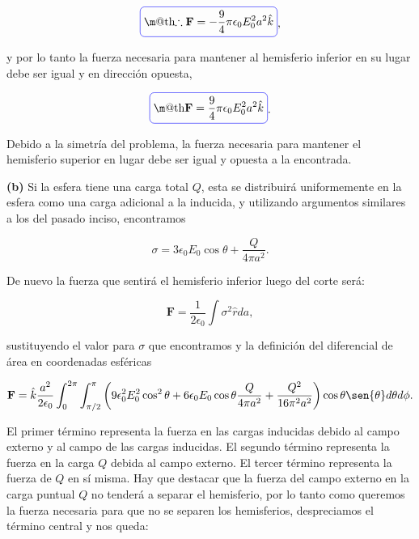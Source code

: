 \documentclass[a4paper,10pt]{article}
\makeatletter
\numberwithin{equation}{section}
\newcommand*{\boxcolor}{blue}
\renewcommand{\boxed}[1]{\textcolor{\boxcolor}{%
\tikz[baseline={([yshift=-1ex]current bounding box.center)}] \node [rectangle, minimum width=1ex,rounded corners,draw] {\normalcolor\m@th$\displaystyle#1$};}}
\makeatother
\begin{document}
\begin{equation}
 \boxed{\therefore \mathbf{F} = - \frac{9}{4}\pi\epsilon_0E_0^2a^2\hat{k}},
\end{equation}

y por lo tanto la fuerza necesaria para mantener al hemisferio inferior en su lugar 
debe ser igual y en dirección opuesta, 

\begin{equation}
 \boxed{\mathbf{F} = \frac{9}{4}\pi\epsilon_0E_0^2a^2\hat{k}}.
\end{equation}

Debido a la simetría del problema, la fuerza necesaria para mantener el hemisferio 
superior en lugar debe ser igual y opuesta a la encontrada.

\vspace{.3cm}

\textbf{(b)} Si la esfera tiene una carga total $Q$, esta se distribuirá uniformemente 
en la esfera como una carga adicional a la inducida, y utilizando argumentos similares 
a los del pasado inciso, encontramos 

\begin{equation}
 \sigma = 3\epsilon_0 E_0 \cos{\theta} + \frac{Q}{4\pi a^2}.
\end{equation}

De nuevo la fuerza que sentirá el hemisferio inferior luego del corte será:

\begin{equation}
 \mathbf{F} = \frac{1}{2\epsilon_0}\int \sigma^2 \hat{r} da,
\end{equation}

sustituyendo el valor para $\sigma$ que encontramos y la definición del diferencial 
de área en coordenadas esféricas

\begin{equation}
 \mathbf{F} = \hat{k} \frac{a^2}{2\epsilon_0}\int_0^{2\pi} \int_{\pi/2}^\pi
 \left(9\epsilon_0^2E_0^2 \cos^2{\theta} + 6\epsilon_0 E_0 \cos{\theta}
 \frac{Q}{4\pi a^2} + \frac{Q^2}{16\pi^2a^2}\right)\cos{\theta}\sen{\theta}
 d\theta d\phi.
\end{equation}

El primer término representa la fuerza en las cargas inducidas debido al campo 
externo y al campo de las cargas inducidas. El segundo término representa la fuerza 
en la carga $Q$ debida al campo externo. El tercer término representa la fuerza de 
$Q$ en sí misma. Hay que destacar que la fuerza del campo externo en la carga puntual
$Q$ no tenderá a separar el hemisferio, por lo tanto como queremos la fuerza necesaria 
para que no se separen los hemisferios, despreciamos el término central y nos queda:
\end{document}
